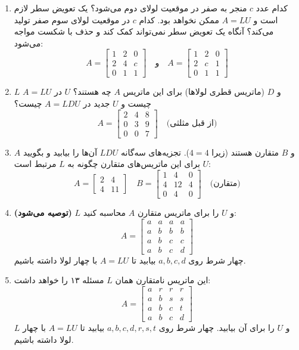 \documentclass[12pt, a4paper]{book}
\begin{document}
\begin{enumerate}
		\item کدام عدد $c$ منجر به صفر در موقعیت لولای دوم می‌شود؟ یک تعویض سطر لازم است و $A=LU$ ممکن نخواهد بود. کدام $c$ در موقعیت لولای سوم صفر تولید می‌کند؟ آنگاه یک تعویض سطر نمی‌تواند کمک کند و حذف با شکست مواجه می‌شود:
		\[ A = \begin{bmatrix} 1 & 2 & 0 \\ 2 & 4 & c \\ 0 & 1 & 1 \end{bmatrix} \quad \text{و} \quad A = \begin{bmatrix} 1 & 2 & 0 \\ 2 & c & 1 \\ 0 & 1 & 1 \end{bmatrix} \]
		
		\item $L$ و $D$ (ماتریس قطری لولاها) برای این ماتریس $A$ چه هستند؟ $U$ در $A=LU$ چیست و $U$ جدید در $A=LDU$ چیست؟
		\[ A = \begin{bmatrix} 2 & 4 & 8 \\ 0 & 3 & 9 \\ 0 & 0 & 7 \end{bmatrix} \quad \text{(از قبل مثلثی)} \]
		
		\item $A$ و $B$ متقارن هستند (زیرا $4=4$). تجزیه‌های سه‌گانه $LDU$ آن‌ها را بیابید و بگویید $U$ برای این ماتریس‌های متقارن چگونه به $L$ مرتبط است:
		\[ A = \begin{bmatrix} 2 & 4 \\ 4 & 11 \end{bmatrix} \quad B = \begin{bmatrix} 1 & 4 & 0 \\ 4 & 12 & 4 \\ 0 & 4 & 0 \end{bmatrix} \quad \text{(متقارن)} \]
		
		\item \textbf{(توصیه می‌شود)} $L$ و $U$ را برای ماتریس متقارن $A$ محاسبه کنید:
		\[ A = \begin{bmatrix} a & a & a & a \\ a & b & b & b \\ a & b & c & c \\ a & b & c & d \end{bmatrix} \]
		چهار شرط روی $a, b, c, d$ بیابید تا $A=LU$ با چهار لولا داشته باشیم.
		
		\item این ماتریس نامتقارن همان $L$ مسئله ۱۳ را خواهد داشت:
		\[ A = \begin{bmatrix} a & r & r & r \\ a & b & s & s \\ a & b & c & t \\ a & b & c & d \end{bmatrix} \]
		$L$ و $U$ را برای آن بیابید. چهار شرط روی $a, b, c, d, r, s, t$ بیابید تا $A=LU$ با چهار لولا داشته باشیم.
		

\end{enumerate}
\end{document}
